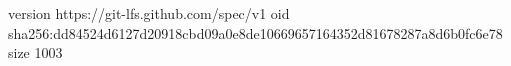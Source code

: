 version https://git-lfs.github.com/spec/v1
oid sha256:dd84524d6127d20918cbd09a0e8de10669657164352d81678287a8d6b0fc6e78
size 1003
